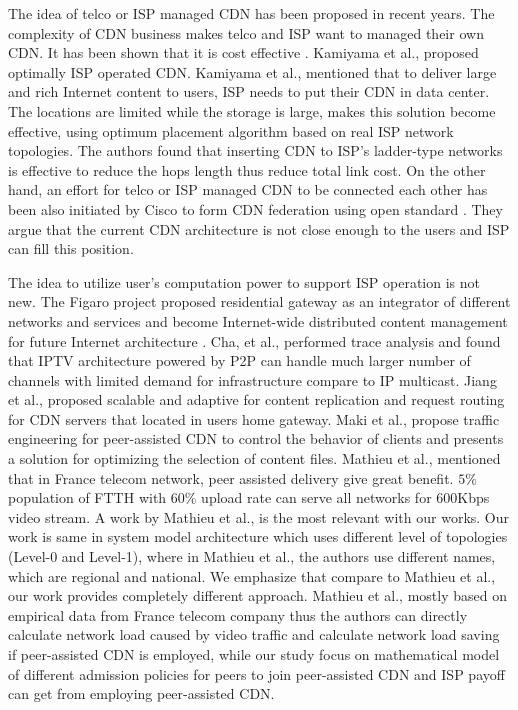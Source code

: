 \documentclass[paper]{ieice}
\begin{document}
The idea of telco or ISP managed CDN has been proposed in recent years.  
The complexity of CDN business makes telco and ISP want to managed their own CDN.
It has been shown that it is cost effective \cite{federation}\cite{norton2011internet}. 
Kamiyama et al., \cite{NoriakiKAMIYAMA2013} proposed optimally ISP operated CDN. 
Kamiyama et al., mentioned that to deliver large and rich Internet content to users, ISP needs to put their CDN in data center.
The locations are limited while the storage is large, makes this solution become effective, using optimum placement algorithm based on real ISP network topologies.
The authors found that inserting CDN to ISP's ladder-type networks is effective to reduce the hops length thus reduce total link cost. 
On the other hand, an effort for telco or ISP managed CDN to be connected each other has been also initiated by Cisco to form CDN federation \cite{federation} using open standard \cite{cdni}.
They argue that the current CDN architecture is not close enough to the users and ISP can fill this position.   

The idea to utilize user's computation power to support ISP operation is not new.  
The Figaro project \cite{figaro} proposed residential gateway as an integrator of different networks and services and become Internet-wide distributed content management for future Internet architecture \cite{figaro}. 
Cha, et al.,\cite{Cha:2008:NTP:1855641.1855646} performed trace analysis and found that IPTV architecture powered by P2P can handle much larger number of channels with limited demand for infrastructure compare to IP multicast. 
Jiang et al., \cite{Jiang:2012:OMD:2413176.2413193} proposed scalable and adaptive for content replication and request routing for CDN servers that located in users home gateway. 
Maki et al.,\cite{NaoyaMAKI2012} propose traffic engineering for peer-assisted CDN to control the behavior of clients and presents a solution for optimizing the selection of content files.
Mathieu et al., \cite{6249305} mentioned that in France telecom network, peer assisted delivery give great benefit. 
$5\%$ population of FTTH with $60\%$ upload rate can serve all networks for 600Kbps video stream.
A work by Mathieu et al., \cite{6249305} is the most relevant with our works.
Our work is same in system model architecture which uses different level of topologies  (Level-0 and Level-1), where in Mathieu et al., \cite{6249305} the authors use different names, which are regional and national. 
We emphasize that compare to  Mathieu et al., \cite{6249305} our work provides completely different approach.
Mathieu et al., \cite{6249305} mostly based on empirical data from France telecom company thus the authors can directly calculate network load caused by video traffic and calculate network load saving if peer-assisted CDN is employed,  while our study focus on mathematical model of different admission policies for peers to join peer-assisted CDN and ISP payoff can get from employing peer-assisted CDN.
\end{document}
